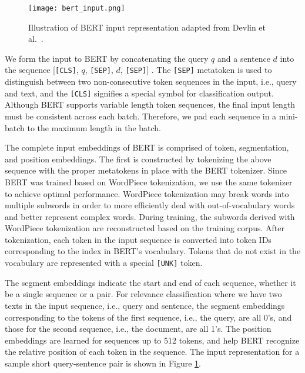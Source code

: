 
\begin{figure}[b!]
\centering
  \texttt{[image: bert\_input.png]}
\caption{Illustration of BERT input representation adapted from Devlin et al.~\cite{devlin2018bert}.}
\label{fig:bert_input}
\end{figure}

We form the input to BERT by concatenating the query $ q $ and a sentence $ d $ into the sequence [\texttt{[CLS]}, $q$, \texttt{[SEP]}, $d$, \texttt{[SEP]}] .
The \texttt{[SEP]} metatoken is used to distinguish between two non-consecutive token sequences in the input, i.e., query and text, and the \texttt{[CLS]} signifies a special symbol for classification output.
Although BERT supports variable length token sequences, the final input length must be consistent across each batch.
Therefore, we pad each sequence in a mini-batch to the maximum length in the batch.

The complete input embeddings of BERT is comprised of token, segmentation, and position embeddings.
The first is constructed by tokenizing the above sequence with the proper metatokens in place with the BERT tokenizer.
Since BERT was trained based on WordPiece tokenization, we use the same tokenizer to achieve optimal performance.
WordPiece tokenization may break words into multiple subwords in order to more efficiently deal with out-of-vocabulary words and better represent complex words.
During training, the subwords derived with WordPiece tokenization are reconstructed based on the training corpus.
After tokenization, each token in the input sequence is converted into token IDs corresponding to the index in BERT's vocabulary.
Tokens that do not exist in the vocabulary are represented with a special \texttt{[UNK]} token.

The segment embeddings indicate the start and end of each sequence, whether it be a single sequence or a pair.
For relevance classification where we have two texts in the input sequence, i.e., query and sentence, the segment embeddings corresponding to the tokens of the first sequence, i.e., the query, are all 0's, and those for the second sequence, i.e., the document, are all 1's.
The position embeddings are learned for sequences up to 512 tokens, and help BERT recognize the relative position of each token in the sequence.
The input representation for a sample short query-sentence pair is shown in Figure \ref{fig:bert_input}.

